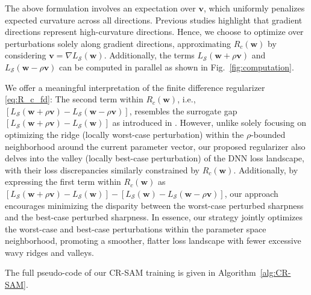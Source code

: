 \documentclass[letterpaper]{article} %
\theoremstyle{plain}
\theoremstyle{definition}
\newcommand{\fref}[1]{Fig.~\ref{#1}}
\begin{document}
The above formulation involves an expectation over $\boldsymbol{v}$, which uniformly penalizes expected curvature across all directions. Previous studies \cite{fawzi2018empirical,moosavi2019robustness} highlight that gradient directions represent high-curvature directions. Hence, we choose to optimize over perturbations solely along gradient directions, approximating $R_c(\boldsymbol{w})$ by considering $\boldsymbol{v} = \nabla L_{\mathcal{S}}(\boldsymbol{w})$. Additionally, the terms $L_{\mathcal{S}}(\boldsymbol{w} + \rho\boldsymbol{v})$ and $L_{\mathcal{S}}(\boldsymbol{w} - \rho\boldsymbol{v})$ can be computed in parallel as shown in \fref{fig:computation}.



We offer a meaningful interpretation of the finite difference regularizer \eqref{eq:R_c_fd}: The second term within $R_c(\boldsymbol{w})$, i.e., $[L_{\mathcal{S}}(\boldsymbol{w} + \rho\boldsymbol{v}) - L_{\mathcal{S}}(\boldsymbol{w} - \rho\boldsymbol{v})]$, resembles the surrogate gap $[L_{\mathcal{S}}(\boldsymbol{w} + \rho\boldsymbol{v}) - L_{\mathcal{S}}(\boldsymbol{w})]$ as introduced in \cite{zhuang2022surrogate}. However, unlike solely focusing on optimizing the ridge (locally worst-case perturbation) within the $\rho$-bounded neighborhood around the current parameter vector, our proposed regularizer also delves into the valley (locally best-case perturbation) of the DNN loss landscape, with their loss discrepancies similarly constrained by $R_c(\boldsymbol{w})$. Additionally, by expressing the first term within $R_c(\boldsymbol{w})$ as $[L_{\mathcal{S}}(\boldsymbol{w}+\rho\boldsymbol{v}) - L_{\mathcal{S}}(\boldsymbol{w})] - [L_{\mathcal{S}}(\boldsymbol{w}) - L_{\mathcal{S}}(\boldsymbol{w}-\rho\boldsymbol{v})]$, our approach encourages minimizing the disparity between the worst-case perturbed sharpness and the best-case perturbed sharpness. In essence, our strategy jointly optimizes the worst-case and best-case perturbations within the parameter space neighborhood, promoting a smoother, flatter loss landscape with fewer excessive wavy ridges and valleys.


The full pseudo-code of our CR-SAM training is given in Algorithm~\ref{alg:CR-SAM}.
\end{document}
